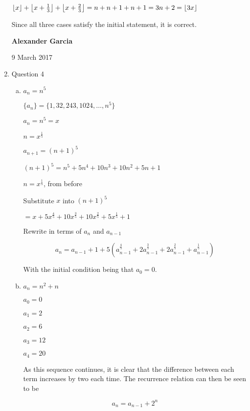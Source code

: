 \documentclass[11pt]{article}
\DeclarePairedDelimiter\floor{\lfloor}{\rfloor}
\begin{document}
\begin{enumerate}
\begin{tabular}{ll}
		\end{tabular}

		$\floor*{x} + \floor*{x + \frac{1}{3}} +
		\floor*{x + \frac{2}{3}} = n + n + 1 + n + 1 =
		3n + 2 = \floor*{3x}$

		Since all three cases satisfy the initial statement,
		it is correct. \\

		\newpage

		\textbf{Alexander Garcia}

		9 March 2017 \\

	\item Question 4

		\begin{enumerate}[(a)]

			\item $a_n = n^5$

				$\{a_n\} = \{1, 32, 243, 1024, \dots, n^5\}$

				$a_n = n^5 = x$

				$n = x^{\frac{1}{5}}$

				$a_{n+1} = (n+1)^5$

				$(n+1)^5 = n^5 + 5n^4 + 10n^3 + 10n^2 + 5n + 1$

				$n = x^{\frac{1}{5}}$, from before

				Substitute $x$ into $(n+1)^5$

				$= x + 5x^{\frac{4}{5}} + 10x^{\frac{3}{5} } + 10x^{\frac{2}{5} }+
				5x^{\frac{1}{5} } + 1$

				Rewrite in terms of $a_n$ and $a_{n-1}$

				$$a_n = a_{n-1} + 1 + 5(a_{n-1}^{\frac{4}{5}} + 2a_{n-1}^{\frac{3}{5} }+
				2a_{n-1}^{\frac{2}{5} } + a_{n-1}^{\frac{1}{5} })$$

				With the initial condition being that $a_0 = 0$. \\

			\item $a_n = n^2 + n$

				$a_0 = 0$

				$a_1 = 2$

				$a_2 = 6$

				$a_3 = 12$

				$a_4 = 20$

				As this sequence continues, it is clear that the difference between
				each term increases by two each time. The recurrence relation can
				then be seen to be

				$$a_n = a_{n-1} + 2^n$$


\end{enumerate}
\end{enumerate}
\end{document}
